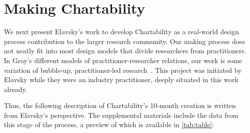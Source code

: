 \documentclass{egpubl}
\begin{document}
\section{Making Chartability}
We next present Elavsky’s work to develop Chartability as a real-world design process contribution to the larger research community. Our making process does not neatly fit into most design models that divide researchers from practitioners. In Gray's different models of practitioner-researcher relations, our work is some variation of bubble-up, practitioner-led research~\cite{gray_reprioritizing_2014}. This project was initiated by Elavsky while they were an industry practitioner, deeply situated in this work already.

Thus, the following description of Chartability’s 10-month creation is written from Elavsky’s perspective. The supplemental materials include the data from this stage of the process, a preview of which is available in \autoref{tab:table}: 
\end{document}
